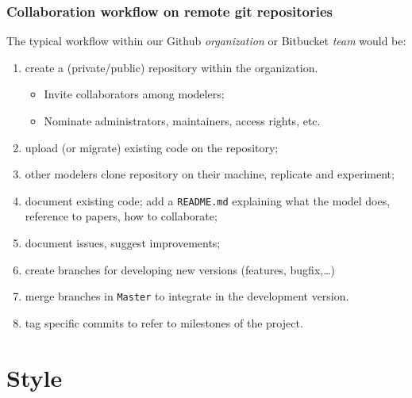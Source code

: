 \documentclass[10pt,svgnames]{beamer}
\begin{document}
\begin{frame}
\frametitle{Collaboration workflow on remote git repositories}
The typical workflow within our Github \emph{organization} or Bitbucket \emph{team} would be:
\begin{enumerate}[<+->]
  \item create a (private/public) repository within the organization.
  \begin{itemize}
    \item Invite collaborators among modelers;
    \item Nominate administrators, maintainers, access rights, etc.
  \end{itemize}
  \item upload (or migrate) existing code on the repository;
  \item other modelers clone repository on their machine, replicate and experiment;
  \item document existing code; add a \texttt{README.md} explaining what the model does, reference to papers, how to collaborate;
  \item document issues, suggest improvements;
  \item create branches for developing new versions (features, bugfix,\ldots)
  \item merge branches in \texttt{Master} to integrate in the development version.
  \item tag specific commits to refer to milestones of the project.
\end{enumerate}

\end{frame}



\section{Style}
\end{document}
